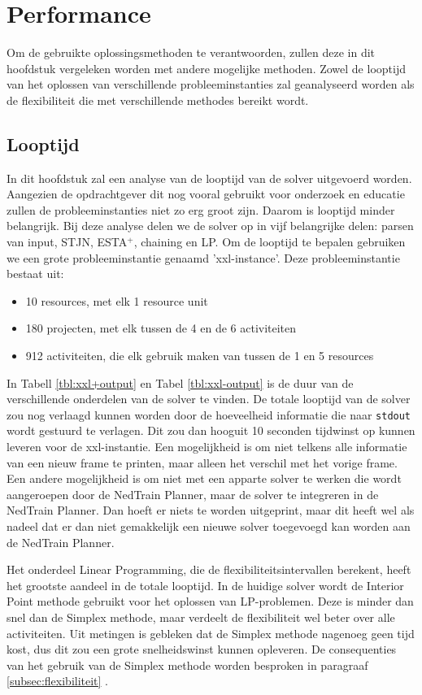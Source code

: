 \section{Performance}
Om de gebruikte oplossingsmethoden te verantwoorden, zullen deze in dit hoofdstuk vergeleken worden met andere mogelijke methoden. Zowel de looptijd van het oplossen van verschillende probleeminstanties zal geanalyseerd worden als de flexibiliteit die met verschillende methodes bereikt wordt.

\subsection{Looptijd}
In dit hoofdstuk zal een analyse van de looptijd van de solver uitgevoerd worden. Aangezien de opdrachtgever dit nog vooral gebruikt voor onderzoek en educatie zullen de probleeminstanties niet zo erg groot zijn. Daarom is looptijd minder belangrijk. Bij deze analyse delen we de solver op in vijf belangrijke delen: parsen van input, STJN, ESTA$^+$, chaining en LP. Om de looptijd te bepalen gebruiken we een grote probleeminstantie genaamd 'xxl-instance'. Deze probleeminstantie bestaat uit:
\begin{itemize}
    \item 10 resources, met elk 1 resource unit
    \item 180 projecten, met elk tussen de 4 en de 6 activiteiten
    \item 912 activiteiten, die elk gebruik maken van tussen de 1 en 5 resources
\end{itemize}

In Tabell \ref{tbl:xxl+output} en Tabel \ref{tbl:xxl-output} is de duur van de verschillende onderdelen van de solver te vinden. De totale looptijd van de solver zou nog verlaagd kunnen worden door de hoeveelheid informatie die naar \texttt{stdout} wordt gestuurd te verlagen. Dit zou dan hooguit 10 seconden tijdwinst op kunnen leveren voor de xxl-instantie. Een mogelijkheid is om niet telkens alle informatie van een nieuw frame te printen, maar alleen het verschil met het vorige frame. Een andere mogelijkheid is om niet met een apparte solver te werken die wordt aangeroepen door de NedTrain Planner, maar de solver te integreren in de NedTrain Planner. Dan hoeft er niets te worden uitgeprint, maar dit heeft wel als nadeel dat er dan niet gemakkelijk een nieuwe solver toegevoegd kan worden aan de NedTrain Planner.

Het onderdeel Linear Programming, die de flexibiliteitsintervallen berekent, heeft het grootste aandeel in de totale looptijd. In de huidige solver wordt de Interior Point methode gebruikt voor het oplossen van LP-problemen. Deze is minder dan snel dan de Simplex methode, maar verdeelt de flexibiliteit wel beter over alle activiteiten. Uit metingen is gebleken dat de Simplex methode nagenoeg geen tijd kost, dus dit zou een grote snelheidswinst kunnen opleveren. De consequenties van het gebruik van de Simplex methode worden besproken in paragraaf \ref{subsec:flexibiliteit} .

